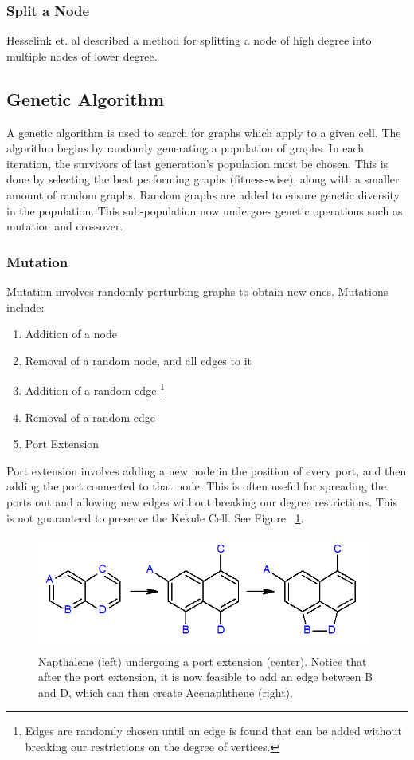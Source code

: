 \documentclass[12pt]{article}
\begin{document}
\subsubsection{Split a Node}

Hesselink et. al \cite{HH13} described a method for splitting a node of high degree into multiple nodes of lower degree. 

\subsection{Genetic Algorithm}

A genetic algorithm is used to search for graphs which apply to a given cell. The algorithm begins by randomly generating a population of graphs. In each iteration, the survivors of last generation's population must be chosen. This is done by selecting the best performing graphs (fitness-wise), along with a smaller amount of random graphs. Random graphs are added to ensure genetic diversity in the population. This sub-population now undergoes genetic operations such as mutation and crossover. 

\subsubsection{Mutation}

Mutation involves randomly perturbing graphs to obtain new ones. Mutations include:
\begin{enumerate}
\item Addition of a node
\item Removal of a random node, and all edges to it
\item Addition of a random edge \footnote{ Edges are randomly chosen until an edge is found that can be added without breaking our restrictions on the degree of vertices.}
\item Removal of a random edge
\item Port Extension
\end{enumerate}

Port extension involves adding a new node in the position of every port, and then adding the port connected to that node. This is often useful for spreading the ports out and allowing new edges without breaking our degree restrictions. This is not guaranteed to preserve the Kekule Cell. See Figure ~\ref{fig:portExtension}.

\begin{figure}[ht!]
\centering
\includegraphics[width=110mm]{portExtension.png}
\caption{Napthalene (left) undergoing a port extension (center). Notice that after the port extension, it is now feasible to add an edge between B and D, which can then create Acenaphthene (right).}
\label{fig:portExtension}
\end{figure}
\end{document}
